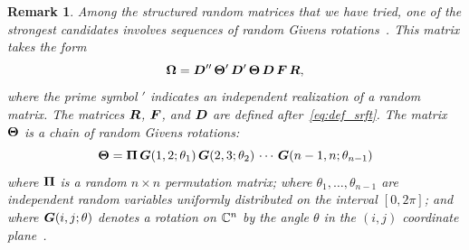 \documentclass[final]{siamltex}
\newcommand{\pgnotate}[1]{{\color{blue}[#1]}}
\newtheorem{remark}{Remark}[section]
\begin{document}
\lsp

\begin{remark}
\label{remark:random_givens}\rm
Among the structured random matrices that
we have tried, one of the strongest candidates involves sequences
of random Givens rotations~\cite{2008_rokhlin_leastsquares}.
This matrix takes the form
\begin{equation}
\label{eq:random_Givens}
\mtx{\Omega} = \mtx{D}''\,\mtx{\Theta}'\,\mtx{D}'\,\mtx{\Theta}\,\mtx{D}\,\mtx{F}\,\mtx{R},
\end{equation}
where the prime symbol $'$ indicates an independent realization
of a random matrix.
The matrices $\bm{R}$, $\bm{F}$, and $\bm{D}$ are defined after~\eqref{eq:def_srft}.
The matrix $\bm{\Theta}$ is a chain of random Givens rotations:
$$
\bm{\Theta} = \bm{\Pi} \,\bm{G}(1, 2; \theta_1) \,\bm{G}(2, 3; \theta_2) \, \cdots \,
\bm{G}(n-1, n; \theta_{n-1})
$$
where $\bm{\Pi}$ is a random $n \times n$ permutation matrix;
where $\theta_1, \dots, \theta_{n-1}$ are independent random
variables uniformly distributed on the interval $[0, 2\pi]$;
and where $\bm{G}(i, j; \theta)$ denotes a rotation on $\mathbb{C}^{n}$ by the angle $\theta$
in the $(i, j)$ coordinate plane~\cite[\S5.1.8]{golub}.
\end{remark}
\end{document}
